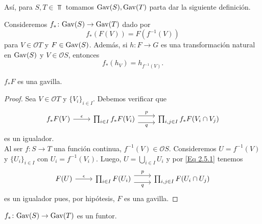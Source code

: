 Así, para $S, T\in \Top$ tomamos ${\mathrm{Gav}}(S), {\mathrm{Gav}}(T)$ parta dar la siguiente definición.

\begin{definition}\label{Def 2.5.1}
Consideremos $f_*\colon {\mathrm{Gav}}(S)\to {\mathrm{Gav}}(T)$ dado por 
\[
f_*(F(V))=F(f^{-1}(V))
\]
para $V\in \mathcal{O}T$ y $F\in {\mathrm{Gav}}(S)$. Además, si $h\colon F\to G$ es una transformación natural en ${\mathrm{Gav}}(S)$ y $V\in \mathcal{O}S$,
entonces 
\[
f_*(h_V)=h_{f^{-1}(V)}.
\]
\end{definition}

\begin{lema}\label{Lem 2.5.2}
$f_*F$ es una gavilla.
\end{lema}

\begin{proof}
Sea $V\in \mathcal{O}T$ y $\{V_i\}_{i\in I}$. Debemos verificar que
\begin{equation}\label{Eq 2.5.1}
\begin{tikzcd}
	{f_*F(V)} & {\prod_{i\in I}f_*F(V_i)} & {\prod_{i,j\in I}f_*F(V_i\cap V_j)}
	\arrow["\epsilon", from=1-1, to=1-2]
	\arrow["p", shift left=2, from=1-2, to=1-3]
	\arrow["q"', shift right=2, from=1-2, to=1-3]
\end{tikzcd}
\end{equation}
es un igualador.\\

Al ser $f\colon S\to T$ una función continua, $f^{-1}(V)\in \mathcal{O}S$.
Consideremos $U=f^{-1}(V)$ y $\{U_i\}_{i\in I}$ con $U_i=f^{-1}(V_i)$. 
Luego, $U=\bigcup_{i\in I}U_i$ y por \ref{Eq 2.5.1} tenemos
\[\begin{tikzcd}
	{F(U)} & {\prod_{i\in I}F(U_i)} & {\prod_{i,j\in I}F(U_i\cap U_j)}
	\arrow["\epsilon", from=1-1, to=1-2]
	\arrow["p", shift left=2, from=1-2, to=1-3]
	\arrow["q"', shift right=2, from=1-2, to=1-3]
\end{tikzcd}\]
es un igualador pues, por hipótesis, $F$ es una gavilla.
\end{proof}

\begin{lema}\label{Lem 2.5.3}
$f_*\colon {\mathrm{Gav}}(S)\to {\mathrm{Gav}}(T)$ es un funtor.
\end{lema}

